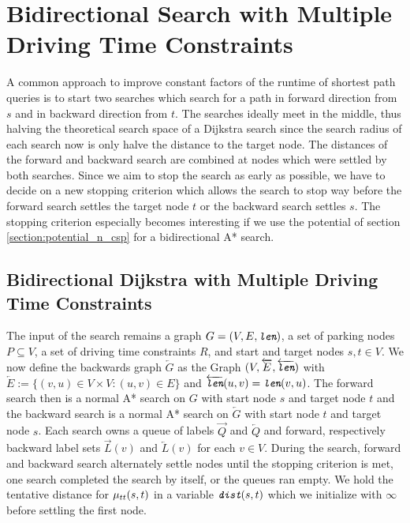 \section{Bidirectional Search with Multiple Driving Time Constraints}
A common approach to improve constant factors of the runtime of shortest path queries is to start two searches which search for a path in forward direction from $s$ and in backward direction from $t$. The searches ideally meet in the middle, thus halving the theoretical search space of a Dijkstra search since the search radius of each search now is only halve the distance to the target node. The distances of the forward and backward search are combined at nodes which were settled by both searches. Since we aim to stop the search as early as possible, we have to decide on a new stopping criterion which allows the search to stop way before the forward search settles the target node $t$ or the backward search settles $s$. The stopping criterion especially becomes interesting if we use the potential of section \ref{section:potential_n_csp} for a bidirectional A* search.

\subsection{Bidirectional Dijkstra with Multiple Driving Time Constraints}
The input of the search remains a graph $G=(V,E,\texttt{\itshape len})$, a set of parking nodes $P \subseteq V$, a set of driving time constraints $R$, and start and target nodes $s,t \in V$. We now define the backwards graph $\overleftarrow{G}$ as the Graph $(V,\overleftarrow{E},\overleftarrow{\texttt{\itshape len}})$ with $\overleftarrow{E} := \{(v,u) \in V \times V : (u,v) \in E\}$ and $\overleftarrow{\texttt{\itshape len}}(u,v) = \texttt{\itshape len}(v,u)$. The forward search then is a normal A* search on $G$ with start node $s$ and target node $t$ and the backward search is a normal A* search on $\overleftarrow{G}$ with start node $t$ and target node $s$. Each search owns a queue of labels $\overrightarrow{Q}$ and $\overleftarrow{Q}$ and forward, respectively backward label sets $\overrightarrow{L}(v)$ and $\overleftarrow{L}(v)$ for each $v \in V$. During the search, forward and backward search alternately settle nodes until the stopping criterion is met, one search completed the search by itself, or the queues ran empty. We hold the tentative distance for $\mu_{tt}(s,t)$ in a variable $\texttt{\itshape dist}(s,t)$ which we initialize with $\infty$ before settling the first node.

